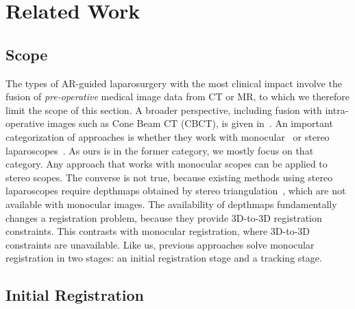 
\section{Related Work}
\label{sec:sota}
\subsection{Scope}
The types of AR-guided laparosurgery with the most clinical impact involve the fusion of \emph{pre-operative} medical image data from CT or MR, to which we therefore limit the scope of this section.
A broader perspective, including fusion with intra-operative images such as Cone Beam CT (CBCT), is given in~\cite{Bernhardt2017}.
An important categorization of approaches is whether they work with monocular~\cite{affineTracking} or stereo laparoscopes~\cite{21142942,conf/miccai/Amir-KhaliliNPHA13,Cohen2010Prostate,hamarneh2014igrs,haouchine13,Su2009, MaierHein2013}.
As ours is in the former category, we mostly focus on that category.
Any approach that works with monocular scopes can be applied to stereo scopes. The converse is not true, because existing methods using stereo laparoscopes require depthmaps obtained by stereo triangulation~\cite{DBLP:conf/miccai/StoyanovSPY10}, which are not available with monocular images.
The availability of depthmaps fundamentally changes a registration problem, because they provide 3D-to-3D registration constraints.
This contrasts with monocular registration, where 3D-to-3D constraints are unavailable.
Like us, previous approaches solve monocular registration in two stages: an initial registration stage and a tracking stage.

\subsection{Initial Registration}

